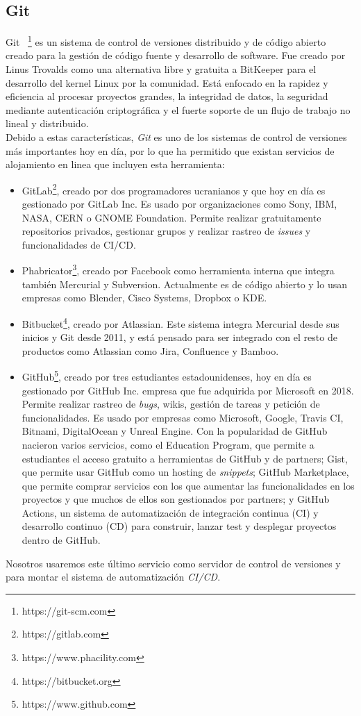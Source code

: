 \subsection{Git}

Git~ \footnote{https://git-scm.com} es un sistema de control de versiones distribuido y de código abierto creado para la gestión de código fuente y desarrollo de software. Fue creado por Linus Trovalds como una alternativa libre y gratuita a BitKeeper para el desarrollo del kernel Linux por la comunidad. Está enfocado en la rapidez y eficiencia al procesar proyectos grandes, la integridad de datos, la seguridad mediante autenticación criptográfica y el fuerte soporte de un flujo de trabajo no lineal y distribuido. \\

Debido a estas características, \textit{Git} es uno de los sistemas de control de versiones más importantes hoy en día, por lo que ha permitido que existan servicios de alojamiento en linea que incluyen esta herramienta:

\begin{itemize}
	\item GitLab\footnote{https://gitlab.com}, creado por dos programadores ucranianos y que hoy en día es gestionado por GitLab Inc. Es usado por organizaciones como Sony, IBM, NASA, CERN o GNOME Foundation. Permite realizar gratuitamente repositorios privados, gestionar grupos y realizar rastreo de \textit{issues} y funcionalidades de CI/CD.
	\item Phabricator\footnote{https://www.phacility.com}, creado por Facebook como herramienta interna que integra también Mercurial y Subversion. Actualmente es de código abierto y lo usan empresas como Blender, Cisco Systems, Dropbox o KDE.
	\item Bitbucket\footnote{https://bitbucket.org}, creado por Atlassian. Este sistema integra Mercurial desde sus inicios y Git desde 2011, y está pensado para ser integrado con el resto de productos como Atlassian como Jira, Confluence y Bamboo.
	\item GitHub\footnote{https://www.github.com}, creado por tres estudiantes estadounidenses, hoy en día es gestionado por GitHub Inc. empresa que fue adquirida por Microsoft en 2018. Permite realizar rastreo de \textit{bugs}, wikis, gestión de tareas y petición de funcionalidades. Es usado por empresas como Microsoft, Google, Travis CI, Bitnami, DigitalOcean y Unreal Engine. Con la popularidad de GitHub nacieron varios servicios, como el Education Program, que permite a estudiantes el acceso gratuito a herramientas de GitHub y de partners; Gist, que permite usar GitHub como un hosting de \textit{snippets}; GitHub Marketplace, que permite comprar servicios con los que aumentar las funcionalidades en los proyectos y que muchos de ellos son gestionados por partners; y GitHub Actions, un sistema de automatización de integración continua (CI) y desarrollo continuo (CD) para construir, lanzar test y desplegar proyectos dentro de GitHub.
\end{itemize}

Nosotros usaremos este último servicio como servidor de control de versiones y para montar el sistema de automatización \textit{CI/CD}.